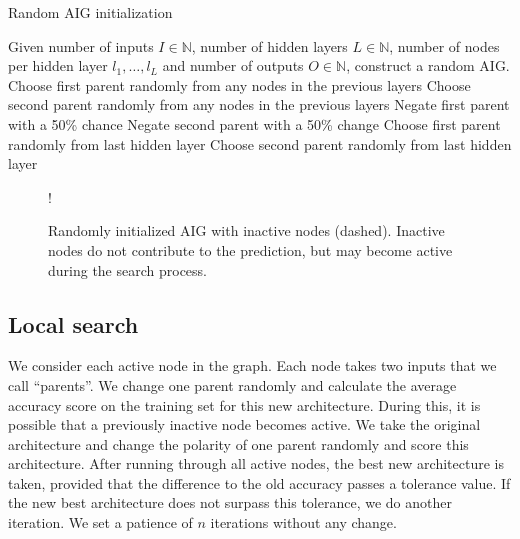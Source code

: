 \begin{algorithm}
  \caption{Random AIG initialization}
  \label{alg:aig_init}
  \begin{algorithmic}
    \State Given number of inputs $I \in \mathds{N}$, number of hidden layers $L \in \mathds{N}$, number of nodes per hidden layer $l_1, \dots, l_L$ and number of outputs $O \in \mathds{N}$, construct a random AIG.
    \vspace{1em}
        \State Choose first parent randomly from any nodes in the previous layers
        \State Choose second parent randomly from any nodes in the previous layers
        \State Negate first parent with a 50\% chance
        \State Negate second parent with a 50\% change
      \EndFor
    \EndFor
      \State Choose first parent randomly from last hidden layer
      \State Choose second parent randomly from last hidden layer
    \EndFor
  \end{algorithmic}
\end{algorithm}
\FloatBarrier

\begin{figure}[!htb]
    \centering
    \resizebox {0.45\textwidth} {!} {
      
    }
    \caption{Randomly initialized AIG with inactive nodes (dashed). Inactive nodes do not contribute to the prediction, but may become active during the search process.}
\label{fig:aig-init}
\end{figure}
\FloatBarrier

\subsection{Local search}
We consider each active node in the graph. Each node takes two inputs that we call \enquote{parents}. We change one parent randomly and calculate the average accuracy score on the training set for this new architecture. During this, it is possible that a previously inactive node becomes active. We take the original architecture and change the polarity of one parent randomly and score this architecture. After running through all active nodes, the best new architecture is taken, provided that the difference to the old accuracy passes a tolerance value. If the new best architecture does not surpass this tolerance, we do another iteration. We set a patience of $n$ iterations without any change.


